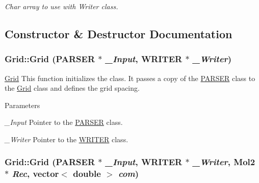 \begin{DoxyCompactItemize}
\begin{DoxyCompactList}\small\item\em Char array to use with Writer class. \item\end{DoxyCompactList}\end{DoxyCompactItemize}


\subsection{Constructor \& Destructor Documentation}
\hypertarget{classGrid_abac50becd4d0bc1c1763533d200daee8}{
\subsubsection[{Grid}]{\setlength{\rightskip}{0pt plus 5cm}Grid::Grid ({\bf PARSER} $\ast$ {\em \_\-Input}, \/  {\bf WRITER} $\ast$ {\em \_\-Writer})}}
\label{classGrid_abac50becd4d0bc1c1763533d200daee8}


\hyperlink{classGrid}{Grid} This function initializes the class. It passes a copy of the \hyperlink{classPARSER}{PARSER} class to the \hyperlink{classGrid}{Grid} class and defines the grid spacing. 
\begin{DoxyParams}{Parameters}
\item[{\em \_\-Input}]Pointer to the \hyperlink{classPARSER}{PARSER} class. \item[{\em \_\-Writer}]Pointer to the \hyperlink{classWRITER}{WRITER} class. \end{DoxyParams}
\hypertarget{classGrid_a67c0d815b4faf1e9f7f6e2a8b52150c8}{
\subsubsection[{Grid}]{\setlength{\rightskip}{0pt plus 5cm}Grid::Grid ({\bf PARSER} $\ast$ {\em \_\-Input}, \/  {\bf WRITER} $\ast$ {\em \_\-Writer}, \/  {\bf Mol2} $\ast$ {\em Rec}, \/  vector$<$ double $>$ {\em com})}}
\label{classGrid_a67c0d815b4faf1e9f7f6e2a8b52150c8}


